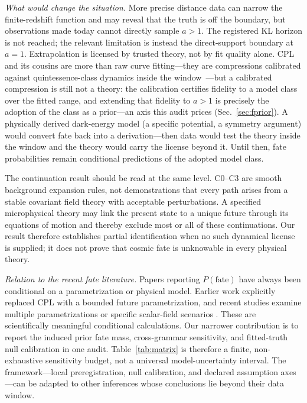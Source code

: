 \documentclass[a4paper,11pt]{article}
\begin{document}
\emph{What would change the situation.} More precise distance data can narrow
the finite-redshift function and may reveal that the truth is off the
boundary, but observations made today cannot directly sample $a>1$. The
registered KL horizon is not reached; the relevant limitation is instead the
direct-support boundary at $a=1$. Extrapolation is licensed by trusted theory,
not by fit quality alone. CPL and its cousins are
more than raw curve fitting---they are compressions calibrated against
quintessence-class dynamics inside the
window~\cite{CaldwellLinder2005,Linder2006,dePutterLinder2008}---but a
calibrated compression is still not a theory: the calibration certifies
fidelity to a model class over the fitted range, and extending that fidelity
to $a>1$ is precisely the adoption of the class as a prior---an axis this
audit prices (Sec.~\ref{sec:fprior}). A physically derived dark-energy model
(a specific potential, a symmetry argument) would convert fate back into a
derivation---then data would test the theory inside the window and the
theory would carry the license beyond it. Until then, fate probabilities
remain conditional predictions of the adopted model class.

The continuation result should be read at the same level. C0--C3 are smooth
background expansion rules, not demonstrations that every path arises from a
stable covariant field theory with acceptable perturbations. A specified
microphysical theory may link the present state to a unique future through its
equations of motion and thereby exclude most or all of these continuations.
Our result therefore establishes partial identification when no such dynamical
license is supplied; it does not prove that cosmic fate is unknowable in every
physical theory.

\emph{Relation to the recent fate literature.} Papers reporting
$P(\text{fate})$ have always been conditional on a parametrization or physical
model. Earlier work explicitly replaced CPL with a bounded future
parametrization, and recent studies examine multiple parametrizations or
specific scalar-field scenarios
\cite{LiFate2012,AndreiIjjasSteinhardt2022,Gialamas2025,Wolf2025}. These are
scientifically meaningful conditional calculations. Our narrower contribution
is to report the induced prior fate mass, cross-grammar sensitivity, and
fitted-truth null calibration in one audit. Table~\ref{tab:matrix} is therefore
a finite, non-exhaustive sensitivity budget, not a universal model-uncertainty
interval. The framework---local preregistration, null calibration, and declared
assumption axes---can be adapted to other inferences whose conclusions lie
beyond their data window.
\end{document}
